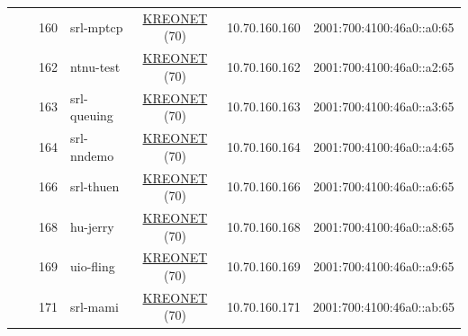 \begin{small}
\begin{center}
\begin{longtable}{|c|c|c|c|c|c|c|c|}
  &  & \tiny{160} & \multicolumn{1}{|l|}{\tiny{srl-mptcp}} & \multicolumn{2}{|c|}{\tiny{\href{http://www.kreonet.net}{KREONET} (70)}} & \tiny{10.70.160.160} & \tiny{2001:700:4100:46a0::a0:65} \\* \cline{3-3}\cline{4-4}\cline{5-5}\cline{6-6}\cline{7-7}\cline{8-8}
  &  & \tiny{162} & \multicolumn{1}{|l|}{\tiny{ntnu-test}} & \multicolumn{2}{|c|}{\tiny{\href{http://www.kreonet.net}{KREONET} (70)}} & \tiny{10.70.160.162} & \tiny{2001:700:4100:46a0::a2:65} \\* \cline{3-3}\cline{4-4}\cline{5-5}\cline{6-6}\cline{7-7}\cline{8-8}
  &  & \tiny{163} & \multicolumn{1}{|l|}{\tiny{srl-queuing}} & \multicolumn{2}{|c|}{\tiny{\href{http://www.kreonet.net}{KREONET} (70)}} & \tiny{10.70.160.163} & \tiny{2001:700:4100:46a0::a3:65} \\* \cline{3-3}\cline{4-4}\cline{5-5}\cline{6-6}\cline{7-7}\cline{8-8}
  &  & \tiny{164} & \multicolumn{1}{|l|}{\tiny{srl-nndemo}} & \multicolumn{2}{|c|}{\tiny{\href{http://www.kreonet.net}{KREONET} (70)}} & \tiny{10.70.160.164} & \tiny{2001:700:4100:46a0::a4:65} \\* \cline{3-3}\cline{4-4}\cline{5-5}\cline{6-6}\cline{7-7}\cline{8-8}
  &  & \tiny{166} & \multicolumn{1}{|l|}{\tiny{srl-thuen}} & \multicolumn{2}{|c|}{\tiny{\href{http://www.kreonet.net}{KREONET} (70)}} & \tiny{10.70.160.166} & \tiny{2001:700:4100:46a0::a6:65} \\* \cline{3-3}\cline{4-4}\cline{5-5}\cline{6-6}\cline{7-7}\cline{8-8}
  &  & \tiny{168} & \multicolumn{1}{|l|}{\tiny{hu-jerry}} & \multicolumn{2}{|c|}{\tiny{\href{http://www.kreonet.net}{KREONET} (70)}} & \tiny{10.70.160.168} & \tiny{2001:700:4100:46a0::a8:65} \\* \cline{3-3}\cline{4-4}\cline{5-5}\cline{6-6}\cline{7-7}\cline{8-8}
  &  & \tiny{169} & \multicolumn{1}{|l|}{\tiny{uio-fling}} & \multicolumn{2}{|c|}{\tiny{\href{http://www.kreonet.net}{KREONET} (70)}} & \tiny{10.70.160.169} & \tiny{2001:700:4100:46a0::a9:65} \\* \cline{3-3}\cline{4-4}\cline{5-5}\cline{6-6}\cline{7-7}\cline{8-8}
  &  & \tiny{171} & \multicolumn{1}{|l|}{\tiny{srl-mami}} & \multicolumn{2}{|c|}{\tiny{\href{http://www.kreonet.net}{KREONET} (70)}} & \tiny{10.70.160.171} & \tiny{2001:700:4100:46a0::ab:65} \\ \hline
\end{longtable}
\end{center}
\end{small}




